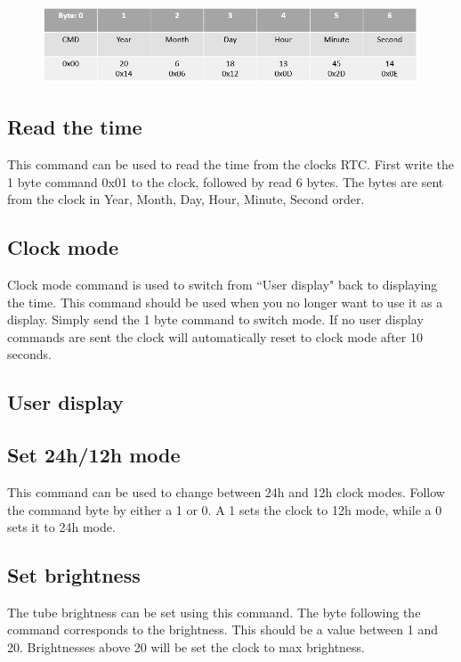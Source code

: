 \documentclass[12pt]{article}
\begin{document}
\begin{figure}[!h]
\includegraphics[scale=0.5]{setTime}
\centering
\caption*{}
\label{fig:status}
\end{figure}

\subsection{Read the time}
This command can be used to read the time from the clocks RTC. First write the 1 byte command 0x01 to the clock, followed by read 6 bytes. The bytes are sent from the clock in Year, Month, Day, Hour, Minute, Second order. 

\subsection{Clock mode}
Clock mode command is used to switch from ``User display" back to displaying the time. This command should be used when you no longer want to use it as a display. Simply send the 1 byte command to switch mode. If no user display commands are sent the clock will automatically reset to clock mode after 10 seconds. 

\subsection{User display}

\subsection{Set 24h/12h mode}
This command can be used to change between 24h and 12h clock modes. Follow the command byte by either a 1 or 0. A 1 sets the clock to 12h mode, while a 0 sets it to 24h mode. 

\subsection{Set brightness}
The tube brightness can be set using this command. The byte following the command corresponds to the brightness. This should be a value between 1 and 20. Brightnesses above 20 will be set the clock to max brightness. 
\end{document}
